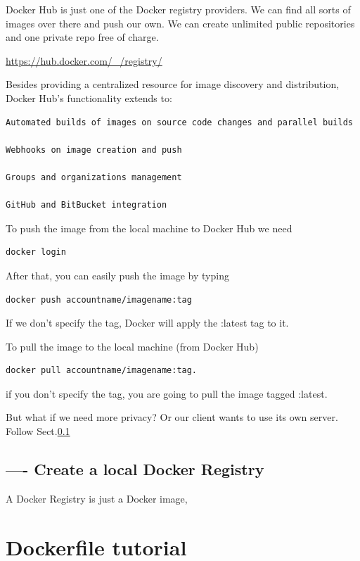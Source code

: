 Docker Hub is just one of the Docker registry providers.
We can find all sorts of images over there and push our own.
We can create unlimited public repositories and one private repo free of
charge.

\url{https://hub.docker.com/_/registry/}

Besides providing a centralized resource for image discovery and distribution,
Docker Hub’s functionality extends to:

\begin{verbatim}
Automated builds of images on source code changes and parallel builds

Webhooks on image creation and push

Groups and organizations management

GitHub and BitBucket integration

\end{verbatim}

To push the image from the local machine to Docker Hub we need
\begin{verbatim}
docker login 
\end{verbatim}
After that, you can easily push the image by typing 
\begin{verbatim}
docker push accountname/imagename:tag
\end{verbatim}

If we don’t specify the tag, Docker will apply the :latest tag to it.


To pull the image to the local machine (from Docker Hub)
\begin{verbatim}
docker pull accountname/imagename:tag.
\end{verbatim}
if you don’t specify the tag, you are going to pull the image tagged :latest.

But what if we need more privacy? Or our client wants to use its own server.
Follow Sect.\ref{sec:Docker-Registry-local}


\subsection{---- Create a local Docker Registry}
\label{sec:Docker-Registry-local}


A Docker Registry is just a Docker image, 

\section{Dockerfile tutorial}
\label{sec:Dockerfile-tutorial}

